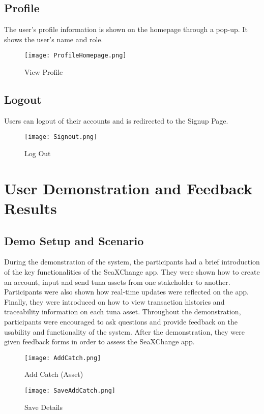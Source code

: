 \subsection{Profile}
The user's profile information is shown on the homepage through a pop-up. It shows the user's name and role.

	\begin{figure}[H]
		\centering
		\texttt{[image: ProfileHomepage.png]}
		\caption{View Profile}
		\label{fig:view_profile}
	\end{figure}

\subsection{Logout}
Users can logout of their accounts and is redirected to the Signup Page.

	\begin{figure}[H]
		\centering
		\texttt{[image: Signout.png]}
		\caption{Log Out}
		\label{fig:signout}
	\end{figure} 

\section{User Demonstration and Feedback Results}
\subsection{Demo Setup and Scenario}
	During the demonstration of the system, the participants had a brief introduction of the key functionalities of the SeaXChange app. They were shown how to create an account, input and send tuna assets from one stakeholder to another. Participants were also shown how real-time updates were reflected on the app. Finally, they were introduced on how to view transaction histories and traceability information on each tuna asset. Throughout the demonstration, participants were encouraged to ask questions and provide feedback on the usability and functionality of the system. After the demonstration, they were given feedback forms in order to assess the SeaXChange app. 
	
	\begin{figure}[H]
		\centering
		\texttt{[image: AddCatch.png]}
		\caption{Add Catch (Asset)}
		\label{fig:add_catch}
	\end{figure}
	
	\begin{figure}[H]
		\centering
		\texttt{[image: SaveAddCatch.png]}
		\caption{Save Details}
		\label{fig:save_details}
	\end{figure}
	

